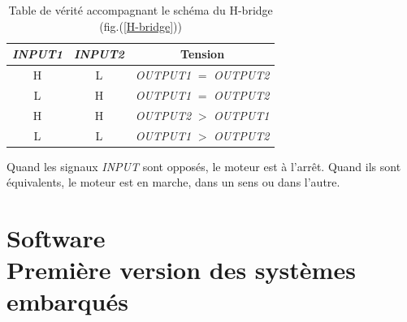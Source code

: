 \documentclass[a4paper,11pt]{report}
\begin{document}
{\begin{table}%
\begin{center}
  \begin{tabular}{c|c||c}  
    \emph{INPUT1} & \emph{INPUT2}
    & Tension\\
    \hline
    H & L & \emph{OUTPUT1} $=$ \emph{OUTPUT2}\\
    L & H & \emph{OUTPUT1} $=$ \emph{OUTPUT2}\\
    H & H & \emph{OUTPUT2} $>$ \emph{OUTPUT1}\\
    L & L & \emph{OUTPUT1} $>$ \emph{OUTPUT2}\\
  \end{tabular}
\end{center}

\caption{\label{tableDeVerite} Table de v\'erit\'e accompagnant le sch\'ema du
H-bridge (fig.(\ref{H-bridge}))}

\small Quand les signaux \emph{INPUT} sont oppos\'es, le moteur est \`a
l'arr\^et. Quand ils sont \'equivalents, le moteur est en marche, dans un sens
ou dans l'autre.\normalsize
\end{table}







\chapter{Software \\  Première version des systèmes embarqués}

}
\end{document}
